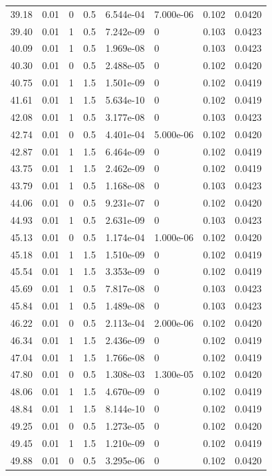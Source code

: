 \documentclass[preview]{standalone}
\begin{document}
{{{\begin{tabular}{L{1.2cm}C{1.2cm} C{0.3cm}C{0.5cm} C{1.4cm}C{1.4cm} C{1.4cm}C{1.4cm}}
  39.18  &  0.01  & 0     & 0.5 &  6.544e-04  & 7.000e-06  & 0.102 &  0.0420   \\ 
  39.40  &  0.01  & 1     & 0.5 &  7.242e-09  & 0  & 0.103 &  0.0423   \\ 
  40.09  &  0.01  & 1     & 0.5 &  1.969e-08  & 0  & 0.103 &  0.0423   \\ 
  40.30  &  0.01  & 0     & 0.5 &  2.488e-05  & 0  & 0.102 &  0.0420   \\ 
  40.75  &  0.01  & 1     & 1.5 &  1.501e-09  & 0  & 0.102 &  0.0419   \\ 
  41.61  &  0.01  & 1     & 1.5 &  5.634e-10  & 0  & 0.102 &  0.0419   \\ 
  42.08  &  0.01  & 1     & 0.5 &  3.177e-08  & 0  & 0.103 &  0.0423   \\ 
  42.74  &  0.01  & 0     & 0.5 &  4.401e-04  & 5.000e-06  & 0.102 &  0.0420   \\ 
  42.87  &  0.01  & 1     & 1.5 &  6.464e-09  & 0  & 0.102 &  0.0419   \\ 
  43.75  &  0.01  & 1     & 1.5 &  2.462e-09  & 0  & 0.102 &  0.0419   \\ 
  43.79  &  0.01  & 1     & 0.5 &  1.168e-08  & 0  & 0.103 &  0.0423   \\ 
  44.06  &  0.01  & 0     & 0.5 &  9.231e-07  & 0  & 0.102 &  0.0420   \\ 
  44.93  &  0.01  & 1     & 0.5 &  2.631e-09  & 0  & 0.103 &  0.0423   \\ 
  45.13  &  0.01  & 0     & 0.5 &  1.174e-04  & 1.000e-06  & 0.102 &  0.0420   \\ 
  45.18  &  0.01  & 1     & 1.5 &  1.510e-09  & 0  & 0.102 &  0.0419   \\ 
  45.54  &  0.01  & 1     & 1.5 &  3.353e-09  & 0  & 0.102 &  0.0419   \\ 
  45.69  &  0.01  & 1     & 0.5 &  7.817e-08  & 0  & 0.103 &  0.0423   \\ 
  45.84  &  0.01  & 1     & 0.5 &  1.489e-08  & 0  & 0.103 &  0.0423   \\ 
  46.22  &  0.01  & 0     & 0.5 &  2.113e-04  & 2.000e-06  & 0.102 &  0.0420   \\ 
  46.34  &  0.01  & 1     & 1.5 &  2.436e-09  & 0  & 0.102 &  0.0419   \\ 
  47.04  &  0.01  & 1     & 1.5 &  1.766e-08  & 0  & 0.102 &  0.0419   \\ 
  47.80  &  0.01  & 0     & 0.5 &  1.308e-03  & 1.300e-05  & 0.102 &  0.0420   \\ 
  48.06  &  0.01  & 1     & 1.5 &  4.670e-09  & 0  & 0.102 &  0.0419   \\ 
  48.84  &  0.01  & 1     & 1.5 &  8.144e-10  & 0  & 0.102 &  0.0419   \\ 
  49.25  &  0.01  & 0     & 0.5 &  1.273e-05  & 0  & 0.102 &  0.0420   \\ 
  49.45  &  0.01  & 1     & 1.5 &  1.210e-09  & 0  & 0.102 &  0.0419   \\ 
  49.88  &  0.01  & 0     & 0.5 &  3.295e-06  & 0  & 0.102 &  0.0420   \\ 
\hline 
\end{tabular} 

}}}
\end{document}
